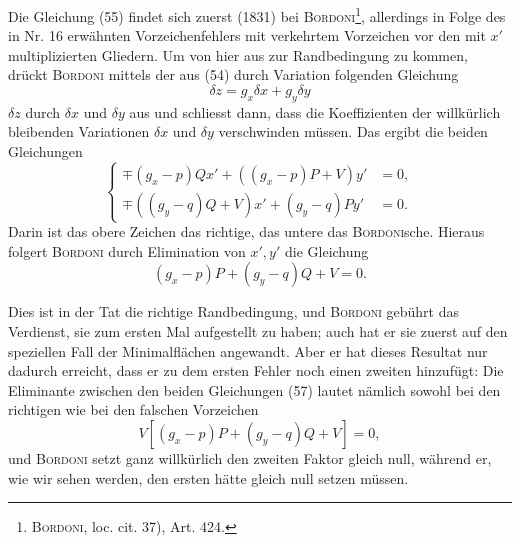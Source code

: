 Die Gleichung (55) findet sich zuerst (1831) bei \textsc{Bordoni}\footnote{\textsc{Bordoni}, loc. cit. 37), Art. 424.}, allerdings in
Folge des in Nr. 16 erwähnten Vorzeichenfehlers mit verkehrtem Vorzeichen
vor den mit $x'$ multiplizierten Gliedern. Um von hier aus zur Randbedingung
zu kommen, drückt \textsc{Bordoni} mittels der aus (54) durch Variation folgenden
Gleichung
\begin{equation*}
\delta z=g_x\delta x+g_y\delta y\tag{56}
\end{equation*}
$\delta z$ durch $\delta x$ und $\delta y$ aus und schliesst dann, dass die Koeffizienten der willkürlich
bleibenden Variationen $\delta x$ und $\delta y$ verschwinden müssen. Das ergibt
die beiden Gleichungen
\begin{equation*}
\left\{\begin{aligned}
\mp(g_x-p)Qx'+((g_x-p)P+V)y'&=0,\\
\mp((g_y-q)Q+V)x'+(g_y-q)Py'&=0.
\end{aligned}\right.\tag{57}
\end{equation*}
Darin ist das obere Zeichen das richtige, das untere das \textsc{Bordoni}sche. Hieraus
folgert \textsc{Bordoni} durch Elimination von $x',y'$ die Gleichung
\begin{equation*}
(g_x-p)P+(g_y-q)Q+V=0.\tag{58}
\end{equation*}

Dies ist in der Tat die richtige Randbedingung, und \textsc{Bordoni} gebührt
das Verdienst, sie zum ersten Mal aufgestellt zu haben; auch hat er sie
zuerst auf den speziellen Fall der Minimalflächen angewandt. Aber er hat
dieses Resultat nur dadurch erreicht, dass er zu dem ersten Fehler noch einen
zweiten hinzufügt: Die Eliminante zwischen den beiden Gleichungen (57) lautet
nämlich sowohl bei den richtigen wie bei den falschen Vorzeichen
\[
V[(g_x-p)P+(g_y-q)Q+V]=0,
\]
und \textsc{Bordoni} setzt ganz willkürlich den zweiten Faktor gleich null, während
er, wie wir sehen werden, den ersten hätte gleich null setzen müssen.

